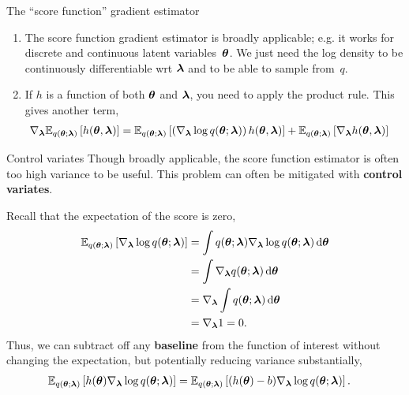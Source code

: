 \documentclass[aspectratio=169]{beamer}
\begin{document}
\begin{frame}[t, allowframebreaks]{The ``score function'' gradient estimator}
\begin{enumerate}
        \item The score function gradient estimator is broadly applicable; e.g. it works for discrete and continuous latent variables~$\boldsymbol{\theta}$. We just need the log density to be continuously differentiable wrt $\boldsymbol{\lambda}$ and to be able to sample from~$q$. 
        
        \item If $h$ is a function of both $\boldsymbol{\theta}$ and $\boldsymbol{\lambda}$, you need to apply the product rule. This gives another term,
        \begin{align*}
        \nabla_{\boldsymbol{\lambda}} \mathbb{E}_{q(\boldsymbol{\theta}; \boldsymbol{\lambda})} \left[ h(\boldsymbol{\theta}, \boldsymbol{\lambda}) \right] 
        &= \mathbb{E}_{q(\boldsymbol{\theta}; \boldsymbol{\lambda})} \left[ \left(\nabla_{\boldsymbol{\lambda}} \log q(\boldsymbol{\theta}; \boldsymbol{\lambda})\right) h(\boldsymbol{\theta}, \boldsymbol{\lambda}) \right]
        + \mathbb{E}_{q(\boldsymbol{\theta}; \boldsymbol{\lambda})} \left[ \nabla_{\boldsymbol{\lambda}} h(\boldsymbol{\theta}, \boldsymbol{\lambda}) \right]
        \end{align*}
        
    \end{enumerate}
\end{frame}

\begin{frame}[t]{Control variates}
    Though broadly applicable, the score function estimator is often too high variance to be useful. This problem can often be mitigated with \textbf{control variates}. 
    
    Recall that the expectation of the score is zero,
    \begin{align*}
        \mathbb{E}_{q(\boldsymbol{\theta}; \boldsymbol{\lambda})} \left[ \nabla_{\boldsymbol{\lambda}} \log q(\boldsymbol{\theta}; \boldsymbol{\lambda})\right] 
        &= \int q(\boldsymbol{\theta}; \boldsymbol{\lambda}) \nabla_{\boldsymbol{\lambda}} \log q(\boldsymbol{\theta}; \boldsymbol{\lambda}) \mathop{}\!\mathrm{d} \boldsymbol{\theta} \\
        &= \int \nabla_{\boldsymbol{\lambda}} q(\boldsymbol{\theta}; \boldsymbol{\lambda}) \mathop{}\!\mathrm{d} \boldsymbol{\theta} \\
        &= \nabla_{\boldsymbol{\lambda}} \int q(\boldsymbol{\theta}; \boldsymbol{\lambda}) \mathop{}\!\mathrm{d} \boldsymbol{\theta} \\
        &= \nabla_{\boldsymbol{\lambda}} 1 = 0.
    \end{align*}
    Thus, we can subtract off any \textbf{baseline} from the function of interest without changing the expectation, but potentially reducing variance substantially,
    \begin{align*}
        \mathbb{E}_{q(\boldsymbol{\theta}; \boldsymbol{\lambda})} \left[ h(\boldsymbol{\theta})  \nabla_{\boldsymbol{\lambda}} \log q(\boldsymbol{\theta}; \boldsymbol{\lambda})\right] 
        &= \mathbb{E}_{q(\boldsymbol{\theta}; \boldsymbol{\lambda})} \left[ (h(\boldsymbol{\theta}) - b)  \nabla_{\boldsymbol{\lambda}} \log q(\boldsymbol{\theta}; \boldsymbol{\lambda})\right].
    \end{align*}
\end{frame}
\end{document}
